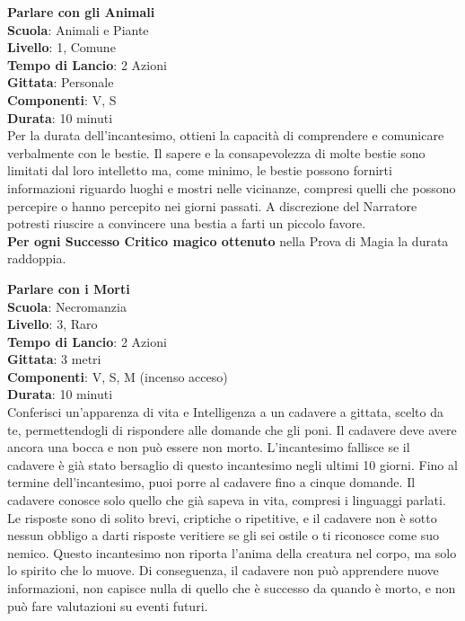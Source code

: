 \begin{multicols}{2}
\medskip\textbf{Parlare con gli Animali}\\
\textbf{Scuola}: Animali e Piante\\
\textbf{Livello}: 1, Comune\\
\textbf{Tempo di Lancio}: 2 Azioni\\
\textbf{Gittata}: Personale\\
\textbf{Componenti}: V, S\\
\textbf{Durata}: 10 minuti\\
Per la durata dell'incantesimo, ottieni la capacità di comprendere e comunicare verbalmente con le bestie. Il sapere e la consapevolezza di molte bestie sono limitati dal loro intelletto ma, come minimo, le bestie possono fornirti informazioni riguardo luoghi e mostri nelle vicinanze, compresi quelli che possono percepire o hanno percepito nei giorni passati. A discrezione del Narratore potresti riuscire a convincere una bestia a farti un piccolo favore.\\
\textbf{Per ogni Successo Critico magico ottenuto} nella Prova di Magia la durata raddoppia.

\medskip\textbf{Parlare con i Morti}\\
\textbf{Scuola}: Necromanzia\\
\textbf{Livello}: 3, Raro\\
\textbf{Tempo di Lancio}: 2 Azioni\\
\textbf{Gittata}: 3 metri\\
\textbf{Componenti}: V, S, M (incenso acceso)\\
\textbf{Durata}: 10 minuti\\
Conferisci un'apparenza di vita e Intelligenza a un cadavere a gittata, scelto da te, permettendogli di rispondere alle domande che gli poni. Il cadavere deve avere ancora una bocca e non può essere non morto. L'incantesimo fallisce se il cadavere è già stato bersaglio di questo incantesimo negli ultimi 10 giorni. Fino al termine dell'incantesimo, puoi porre al cadavere fino a cinque domande. Il cadavere conosce solo quello che già sapeva in vita, compresi i linguaggi parlati. Le risposte sono di solito brevi, criptiche o ripetitive, e il cadavere non è sotto nessun obbligo a darti risposte veritiere se gli sei ostile o ti riconosce come suo nemico. Questo incantesimo non riporta l'anima della creatura nel corpo, ma solo lo spirito che lo muove. Di conseguenza, il cadavere non può apprendere nuove informazioni, non capisce nulla di quello che è successo da quando è morto, e non può fare valutazioni su eventi futuri.


\end{multicols}
